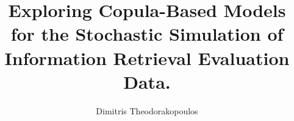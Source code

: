 \documentclass{tudelft-report}
\begin{document}
	\frontmatter %
	\title[tudelft-black]{Exploring Copula-Based Models for the Stochastic Simulation of Information Retrieval Evaluation Data.}
	\author[tudelft-black]{Dimitris Theodorakopoulos}	
	
		
		
		
	\tableofcontents
	\mainmatter %
		
	
	
	
	
	\appendix %
	\printbibliography
	
\end{document}
